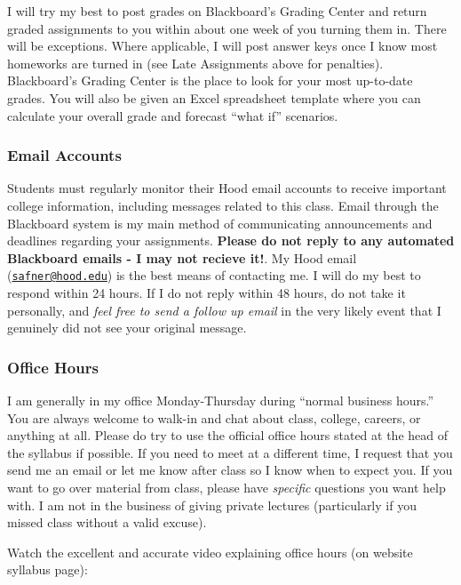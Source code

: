 \documentclass{article}
\begin{document}
I will try my best to post grades on Blackboard's Grading Center and
return graded assignments to you within about one week of you turning
them in. There will be exceptions. Where applicable, I will post answer
keys once I know most homeworks are turned in (see Late Assignments
above for penalties). Blackboard's Grading Center is the place to look
for your most up-to-date grades. You will also be given an Excel
spreadsheet template where you can calculate your overall grade and
forecast ``what if'' scenarios.

\hypertarget{email-accounts}{%
\subsubsection{Email Accounts}\label{email-accounts}}

Students must regularly monitor their Hood email accounts to receive
important college information, including messages related to this class.
Email through the Blackboard system is my main method of communicating
announcements and deadlines regarding your assignments. \textbf{Please
do not reply to any automated Blackboard emails - I may not recieve
it!}. My Hood email
(\href{mailto:safner@hood.edu}{\nolinkurl{safner@hood.edu}}) is the best
means of contacting me. I will do my best to respond within 24 hours. If
I do not reply within 48 hours, do not take it personally, and
\emph{feel free to send a follow up email} in the very likely event that
I genuinely did not see your original message.

\hypertarget{office-hours}{%
\subsubsection{Office Hours}\label{office-hours}}

I am generally in my office Monday-Thursday during ``normal business
hours.'' You are always welcome to walk-in and chat about class,
college, careers, or anything at all. Please do try to use the official
office hours stated at the head of the syllabus if possible. If you need
to meet at a different time, I request that you send me an email or let
me know after class so I know when to expect you. If you want to go over
material from class, please have \emph{specific} questions you want help
with. I am not in the business of giving private lectures (particularly
if you missed class without a valid excuse).

Watch the excellent and accurate video explaining office hours (on
website syllabus page):
\end{document}
